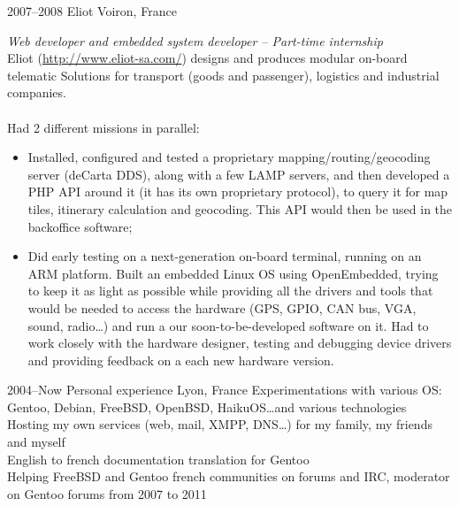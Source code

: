\documentclass[]{friggeri-cv} %
\begin{document}
\begin{entrylist}
\entry
{2007--2008}
{Eliot}
{Voiron, France}
{\emph{Web developer and embedded system developer -- Part-time internship} \\
Eliot (\url{http://www.eliot-sa.com/}) designs and produces modular on-board telematic Solutions for transport (goods and passenger), logistics and industrial companies. \\
\\
Had 2 different missions in parallel:
\begin{itemize}
    \item Installed, configured and tested a proprietary mapping/routing/geocoding server (deCarta DDS), along with a few LAMP servers, and then developed a PHP API around it (it has its own proprietary protocol), to query it for map tiles, itinerary calculation and geocoding. This API would then be used in the backoffice software;
    \item Did early testing on a next-generation on-board terminal, running on an ARM platform. Built an embedded Linux OS using OpenEmbedded, trying to keep it as light as possible while providing all the drivers and tools that would be needed to access the hardware (GPS, GPIO, CAN bus, VGA, sound, radio\dots) and run a our soon-to-be-developed software on it. Had to work closely with the hardware designer, testing and debugging device drivers and providing feedback on a each new hardware version.
\end{itemize}}

\entry
{2004--Now}
{Personal experience}
{Lyon, France}
{Experimentations with various OS: Gentoo, Debian, FreeBSD, OpenBSD, HaikuOS\dots and various technologies \\
Hosting my own services (web, mail, XMPP, DNS\dots) for my family, my friends and myself \\
English to french documentation translation for Gentoo \\
Helping FreeBSD and Gentoo french communities on forums and IRC, moderator on Gentoo forums from 2007 to 2011}
\end{entrylist}

\newpage

\end{document}
